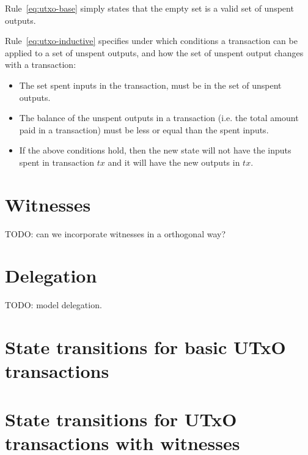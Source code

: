 \documentclass[11pt,a4paper]{article}
\newcommand{\var}[1]{\mathit{#1}}
\begin{document}
Rule~\ref{eq:utxo-base} simply states that the empty set is a valid set of
unspent outputs.

Rule~\ref{eq:utxo-inductive} specifies under which conditions a transaction can
be applied to a set of unspent outputs, and how the set of unspent output changes
with a transaction:
\begin{itemize}
\item The set spent inputs in the transaction, must be in the set of unspent
  outputs.
\item The balance of the unspent outputs in a transaction (i.e. the total
  amount paid in a transaction) must be less or equal than the spent
  inputs.
\item If the above conditions hold, then the new state will not have the inputs
  spent in transaction $\var{tx}$ and it will have the new outputs in
  $\var{tx}$.
\end{itemize}

\section{Witnesses}
\label{sec:witnesses}

TODO: can we incorporate witnesses in a orthogonal way?

\section{Delegation}
\label{sec:delegation}

TODO: model delegation.

\section{State transitions for basic UTxO transactions}
\label{sec:state-trans-basic}

\section{State transitions for UTxO transactions with witnesses}
\label{sec:state-trans-utxo}
\end{document}
